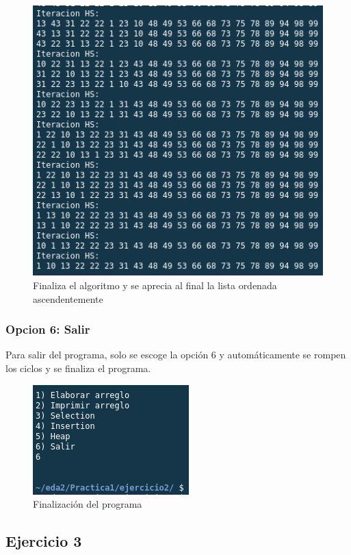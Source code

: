 \documentclass{article}
\begin{document}
			\begin{figure}[H]
				\centering
				\includegraphics[scale = 0.8]{images/e2-5-4}
				\caption{Finaliza el algoritmo y se aprecia al final la lista ordenada ascendentemente}
			\end{figure}
			\newpage
		
			\subsubsection{Opcion 6: Salir}
			
			Para salir del programa, solo se escoge la opción 6 y automáticamente se rompen los ciclos y se finaliza el programa.
			
			\begin{figure}[H]
				\centering
				\includegraphics[scale = 0.8]{images/e2-exit}
				\caption{Finalización del programa}
			\end{figure}
		\newpage
		
		\subsection{Ejercicio 3}
		
\end{document}
